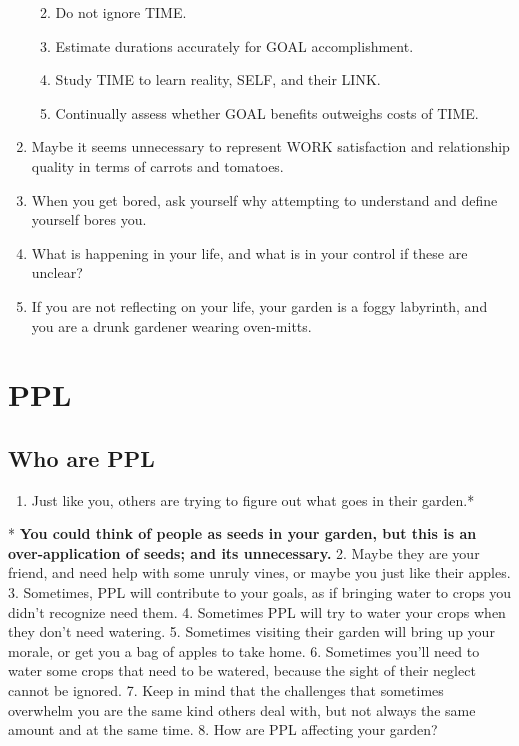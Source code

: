 \documentclass[
]{book}
\providecommand{\tightlist}{%
  \setlength{\itemsep}{0pt}\setlength{\parskip}{0pt}}
\begin{document}
\begin{enumerate}
  \begin{enumerate}
  \def\labelenumii{\arabic{enumii}.}
  \tightlist
  \item
    Do not ignore TIME.
  \item
    Estimate durations accurately for GOAL accomplishment.
  \item
    Study TIME to learn reality, SELF, and their LINK.
  \item
    Continually assess whether GOAL benefits outweighs costs of TIME.
  \end{enumerate}
\item
  Maybe it seems unnecessary to represent WORK satisfaction and relationship
  quality in terms of carrots and tomatoes.
\item
  When you get bored, ask yourself why attempting to understand and define yourself bores you.
\item
  What is happening in your life, and what is in your control if these are unclear?
\item
  If you are not reflecting on your life, your garden is a foggy labyrinth, and you
  are a drunk gardener wearing oven-mitts.
\end{enumerate}

\hypertarget{ppl}{%
\chapter{PPL}\label{ppl}}

\hypertarget{who-are-ppl}{%
\section{Who are PPL}\label{who-are-ppl}}

\begin{enumerate}
\def\labelenumi{\arabic{enumi}.}
\tightlist
\item
  Just like you, others are trying to figure out what goes in their garden.*
\end{enumerate}

* \textbf{You could think of people as seeds in your garden, but this is an over-application of seeds; and its unnecessary.}
2. Maybe they are your friend, and need help with some unruly vines, or
maybe you just like their apples.
3. Sometimes, PPL will contribute to your goals, as if bringing water to crops you didn't recognize need them. 4. Sometimes PPL will try to water your crops when they don't need watering.
5. Sometimes visiting their garden will bring up your morale, or get you a bag of apples to take home.
6. Sometimes you'll need to water some crops that need to be watered, because the sight of their neglect cannot be ignored.
7. Keep in mind that the challenges that sometimes overwhelm you are the same kind others deal with, but not always the same amount and at the same time.
8. How are PPL affecting your garden?
\end{document}
